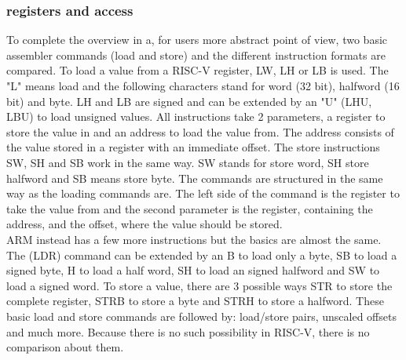 \documentclass[conference]{IEEEtran}
\begin{document}
	\subsubsection{registers and access}
	To complete the overview in a, for users more abstract point of view, two basic assembler commands (load and store) and the different instruction formats are compared.
	To load a value from a RISC-V register, LW, LH or LB is used. The "L" means load and the following characters stand for word (32 bit), halfword (16 bit) and byte. LH and LB are signed and can be extended by an "U" (LHU, LBU) to load unsigned values. \cite{Waterman2017}
	All instructions take 2 parameters, a register to store the value in and an address to load the value from. The address consists of the value stored in a register with an immediate offset.
	The store instructions SW, SH and SB work in the same way. SW stands for store word, SH store halfword and SB means store byte. The commands are structured in the same way as the loading commands are. The left side of the command is the register to take the value from and the second parameter is the register, containing the address, and the offset, where the value should be stored.  \cite{Berkeley2019} \\
	ARM instead has a few more instructions but the basics are almost the same. The (LDR) command can be extended by an B to load only a byte, SB to load a signed byte, H to load a half word, SH to load an signed halfword and SW to load a signed word. To store a value, there are 3 possible ways STR to store the complete register, STRB to store a byte and STRH to store a halfword. These basic load and store commands are followed by: load/store pairs, unscaled offsets and much more. Because there is no such possibility in RISC-V, there is no comparison about them. \cite{Arm2020}
\end{document}
